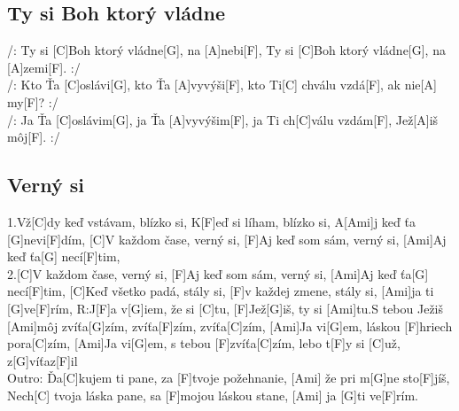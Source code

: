 \documentclass[10pt]{article}
\begin{document}
\begin{Large}
\begin{minipage}{\textwidth}
\begin{multicols}{2}
\subsection{Ty si Boh ktorý vládne}
\begin{guitar}	
	/: Ty si [C]Boh ktorý vládne[G], na [A]nebi[F],  
	Ty si [C]Boh ktorý vládne[G], na [A]zemi[F]. :/ 
	\\
	/: Kto Ťa [C]oslávi[G], kto Ťa [A]vyvýši[F], 
	kto Ti[C] chválu vzdá[F], ak nie[A] my[F]? :/
	\\
	/: Ja Ťa [C]oslávim[G], ja Ťa [A]vyvýšim[F],
	ja Ti ch[C]válu vzdám[F], Jež[A]iš môj[F]. :/
\end{guitar}
\end{multicols}
\end{minipage}

\begin{minipage}{\textwidth}
\subsection{Verný si}
\begin{multicols*}{2}
\begin{guitar}
	1.Vž[C]dy keď vstávam, blízko si,
	K[F]eď si líham, blízko si,
	A[Ami]j keď ťa [G]nevi[F]dím,
	[C]V každom čase, verný si,
	[F]Aj keď som sám, verný si,
	[Ami]Aj keď ťa[G] necí[F]tim,
	\\
	2.[C]V každom čase, verný si,
	[F]Aj keď som sám, verný si,
	[Ami]Aj keď ťa[G] necí[F]tim,
	[C]Keď všetko padá, stály si,
	[F]v každej zmene, stály si,
	[Ami]ja ti [G]ve[F]rím,
	\columnbreak
	R:J[F]a v[G]iem, že si [C]tu,
	[F]Jež[G]iš, ty si [Ami]tu.S tebou Ježiš [Ami]môj
	zvíťa[G]zím, zvíťa[F]zím, zvíťa[C]zím,
	[Ami]Ja vi[G]em, láskou [F]hriech pora[C]zím,
	[Ami]Ja vi[G]em, s tebou [F]zvíťa[C]zím,
	lebo t[F]y si [C]už, z[G]víťaz[F]il
	\\
	Outro:
	Ďa[C]kujem ti pane, 
	za [F]tvoje požehnanie, 
	[Ami] že pri m[G]ne sto[F]jíš,
	Nech[C] tvoja láska pane, 
	sa [F]mojou láskou stane,
	[Ami] ja [G]ti ve[F]rím.
\end{guitar}
\end{multicols*}
\end{minipage}

\begin{minipage}{\textwidth}

\end{minipage}
\end{Large}
\end{document}
